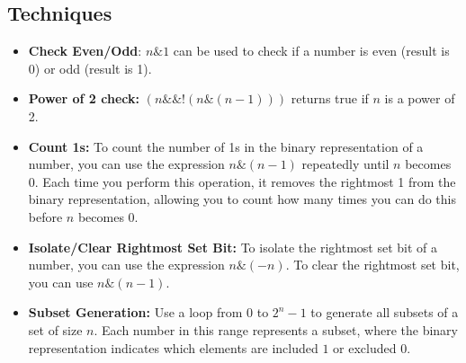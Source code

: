 \subsection{Techniques}

\begin{itemize}
    \item \textbf{Check Even/Odd}: $n \& 1$ can be used to check if a number is even (result is 0) or odd (result is 1).
    \item \textbf{Power of 2 check: } $(n \&\& !(n \& (n - 1)))$ returns true if $n$ is a power of 2.
    \item \textbf{Count 1s: } To count the number of 1s in the binary representation of a number, you can use the expression $n \& (n - 1)$ repeatedly until $n$ becomes 0. Each time you perform this operation, it removes the rightmost 1 from the binary representation, allowing you to count how many times you can do this before $n$ becomes 0.
    \item \textbf{Isolate/Clear Rightmost Set Bit: } To isolate the rightmost set bit of a number, you can use the expression $n \& (-n)$. To clear the rightmost set bit, you can use $n \& (n - 1)$.
    \item \textbf{Subset Generation: } Use a loop from $0$ to $2^n - 1$ to generate all subsets of a set of size $n$. Each number in this range represents a subset, where the binary representation indicates which elements are included $1$ or excluded $0$.
\end{itemize}